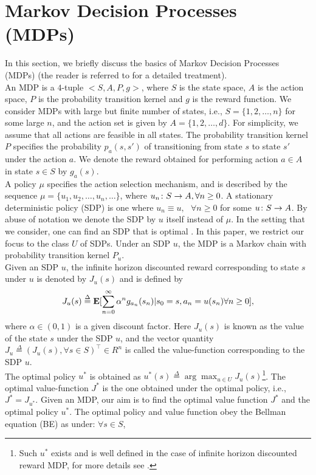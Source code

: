\section{Markov Decision Processes (MDPs)}
In this section, we briefly discuss the basics of Markov Decision Processes (MDPs) (the reader is referred to \cite{BertB,Puter} for a detailed treatment).\\
An MDP is a $4$-tuple $<S,A,P,g>$, where $S$ is the state space, $A$ is the action space, $P$ is the probability transition kernel and $g$ is the reward function. We consider MDPs with large but finite number of states, i.e., $S=\{1,2,\ldots,n\}$ for some large $n$, and the action set is given by $A=\{1,2,\ldots,d\}$. For simplicity, we assume that all actions are feasible in all states. The probability transition kernel $P$ specifies the probability $p_a(s,s')$ of transitioning from state $s$ to state $s'$ under the action $a$. We denote the reward obtained for performing action $a\in A$ in state $s\in S$ by $g_a(s)$.\\
A policy $\mu$ specifies the action selection mechanism, and is described by the sequence $\mu=\{u_1,u_2,\ldots,u_n,\ldots\}$, where $u_n\colon S \rightarrow A, \relax{ }\forall n \geq 0$. A stationary deterministic policy (SDP) is one where $u_n\equiv u, \mbox{ }\forall n\geq 0$ for some $u\colon S \rightarrow A$. By abuse of notation we denote the SDP by $u$ itself instead of $\mu$. In the setting that we consider, one can find an SDP that is optimal \cite{BertB,Puter}. In this paper, we restrict our focus to the class $U$ of SDPs.  Under an SDP $u$, the MDP is a Markov chain with probability transition kernel $P_u$.\\
Given an SDP $u$, the infinite horizon discounted reward corresponding to state $s$ under $u$ is denoted by $J_u(s)$ and is defined by
\begin{align}
J_u(s)\stackrel{\Delta}{=}\mathbf{E}[\sum_{n=0}^\infty \alpha^n g_{a_n}(s_n)|s_0=s,a_n=u(s_n)\relax{ }\forall n\geq 0],\nonumber
\end{align}
where $\alpha \in (0,1)$ is a given discount factor. Here $J_u(s)$ is known as the value of the state $s$ under the SDP $u$, and the vector quantity $J_u\stackrel{\Delta}{=}(J_u(s), \forall s\in S)^\top\in R^n$ is called the value-function corresponding to the SDP $u$.\\
The optimal policy $u^*$ is obtained as $u^*(s)\stackrel{\Delta}{=}\arg\max_{u\in U}J_u(s)$\footnote{Such $u^*$ exists and is well defined in the case of infinite horizon discounted reward MDP, for more details see \cite{Puter}.}. The optimal value-function $J^*$ is the one obtained under the optimal policy, i.e., $J^*=J_{u^*}$. Given an MDP, our aim is to find the optimal value function $J^*$ and the optimal policy $u^*$. The optimal policy and value function obey the Bellman equation (BE) as under: $\forall s \in S$,
